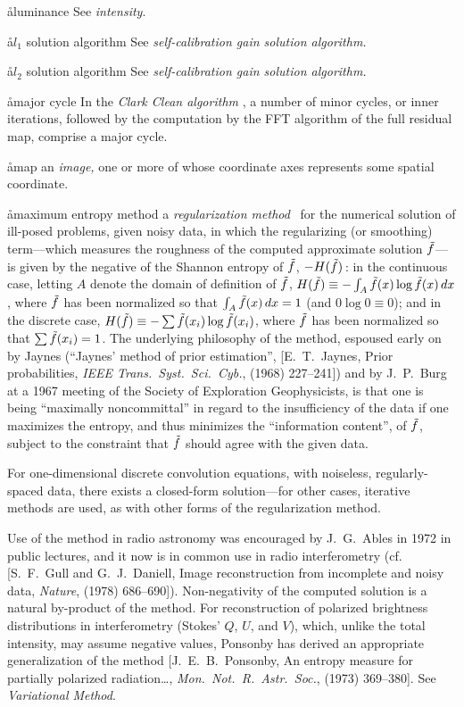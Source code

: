 \aa{luminance} See {\it intensity}.

\aa{$l_1$ solution algorithm} See
{\it self-calibration gain solution algorithm.}

\aa{$l_2$ solution algorithm} See
{\it self-calibration gain solution algorithm.}

\aa{major cycle}
In the {\it Clark Clean algorithm} \qv, a number of minor cycles,
or inner iterations, followed by the computation by the FFT
algorithm of the full residual map, comprise a major cycle.

\aa{map}
an {\it image,} one or more of whose coordinate axes
represents some spatial coordinate.

\aa{maximum entropy method}
a {\it regularization method} \qv\ for the numerical solution
of ill-posed problems, given noisy data, in which the regularizing
(or smoothing) term---which measures the roughness of the
computed approximate solution $\tilde f$---%
is given by the negative of the Shannon entropy of $\tilde f$, $-H(\tilde f)$\,:
in the continuous case, letting $A$ denote the domain of
definition of $\tilde f$,
$H(\tilde f)\equiv -\int_A \tilde f(x)\log \tilde f(x)\,dx$,
where $\tilde f$ has been normalized so that $\int_A \tilde f(x)\,dx=1$
(and $0\log0\equiv0$);
and in the discrete case, $H(\tilde f)\equiv -\sum \tilde f(x_i)\log \tilde f(x_i)$,
where $\tilde f$ has been normalized so that $\sum \tilde f(x_i)=1$.
The underlying philosophy of the method,
espoused early on by Jaynes
(``Jaynes' method of prior estimation'', [E.~T.~Jaynes,
Prior probabilities, {\it IEEE Trans.\ Syst.\ Sci.\ Cyb.},
 (1968) 227--241]) and by J.~P.~Burg at a 1967
meeting of the Society of Exploration Geophysicists,
is that one is being ``maximally noncommittal'' in regard to
the insufficiency of the data if one maximizes the entropy,
and thus minimizes the ``information content'', of $\tilde f$,
subject to the constraint that $\tilde f$ should agree with the
given data.
\par
For one-dimensional discrete convolution equations, with
noiseless, regularly-spaced data, there exists a closed-form
solution---for other cases, iterative methods are used, as
with other forms of the regularization method.
\par
Use of the method in radio astronomy was encouraged
by J.~G.~Ables in 1972 in public lectures,
and it now is in common use in radio interferometry
(cf. [S.~F.~Gull and G.~J.~Daniell, Image reconstruction from
incomplete and noisy data, {\it Nature},  (1978)
686--690]).
Non-negativity of the computed solution is a natural by-product
of the method.
For reconstruction of polarized brightness distributions
in interferometry (Stokes' $Q$, $U$, and $V$),
which, unlike the total intensity, may assume negative values,
Ponsonby has derived an appropriate generalization of the method
[J.~E.~B.~Ponsonby, An entropy measure for partially polarized
radiation\dots, {\it Mon.\ Not.\ R.\ Astr.\ Soc.},  (1973)
369--380].
See {\it Variational Method}.

